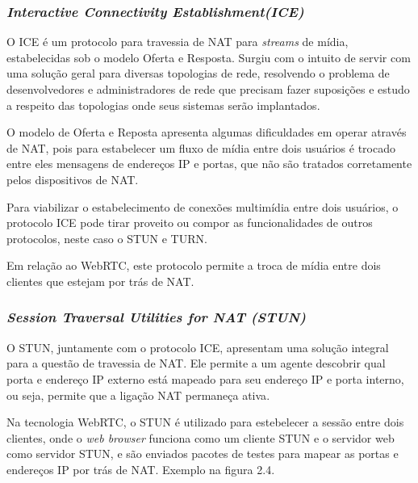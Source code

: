 \documentclass[ruledheader]{abnt} %
\begin{document}
\subsubsection{\textit{Interactive Connectivity Establishment(ICE)}}

O ICE é um protocolo para travessia de NAT para \textit{streams} de mídia, estabelecidas sob o modelo Oferta e Resposta. Surgiu com o intuito de servir com uma solução geral para diversas topologias de rede, resolvendo o problema de desenvolvedores e administradores de rede que precisam fazer suposições e estudo a respeito das topologias onde seus sistemas serão implantados\cite{Varanda:2008}.

O modelo de Oferta e Reposta apresenta algumas dificuldades em operar através de NAT, pois para estabelecer um fluxo de mídia entre dois usuários é trocado entre eles mensagens de endereços IP e portas, que não são tratados corretamente pelos dispositivos de NAT.

Para viabilizar o estabelecimento de conexões multimídia entre dois usuários, o protocolo ICE pode tirar proveito ou compor as funcionalidades de outros protocolos, neste caso o STUN e TURN. 

Em relação ao WebRTC, este protocolo permite a troca de mídia entre dois clientes que estejam por trás de NAT.

\subsubsection{\textit{Session Traversal Utilities for NAT (STUN)}}

O STUN, juntamente com o protocolo ICE, apresentam uma solução integral para a questão de travessia de NAT. Ele permite a um agente descobrir qual porta e endereço IP externo está mapeado para seu endereço IP e porta interno, ou seja, permite que a ligação NAT permaneça ativa\cite{Varanda:2008}. 

Na tecnologia WebRTC, o STUN é utilizado para estebelecer a sessão entre dois clientes, onde o \textit{web browser} funciona como um cliente STUN e o servidor web como servidor STUN, e são enviados pacotes de testes para mapear as portas e endereços IP por trás de NAT. Exemplo na figura 2.4.
\end{document}
